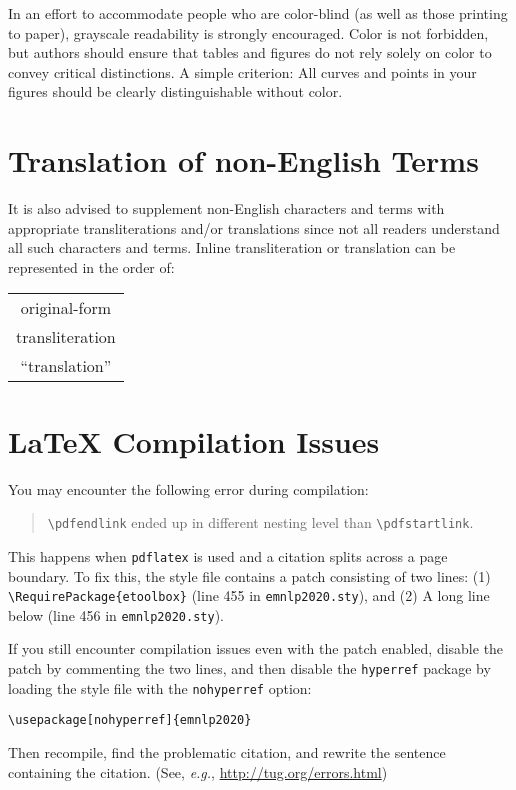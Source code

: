 \documentclass[11pt,a4paper]{article}
\begin{document}
In an effort to accommodate people who are color-blind (as well as those printing to paper), grayscale readability is strongly encouraged.
Color is not forbidden, but authors should ensure that tables and figures do not rely solely on color to convey critical distinctions.
A simple criterion:
All curves and points in your figures should be clearly distinguishable without color.

\section{Translation of non-English Terms}

It is also advised to supplement non-English characters and terms with appropriate transliterations and/or translations since not all readers understand all such characters and terms.
Inline transliteration or translation can be represented in the order of:
\begin{center}
\begin{tabular}{c}
original-form \\
transliteration \\
``translation''
\end{tabular}
\end{center}

\section{\LaTeX{} Compilation Issues}
You may encounter the following error during compilation: 
\begin{quote}
{\small\verb|\pdfendlink|} ended up in different nesting level than {\small\verb|\pdfstartlink|}.
\end{quote}
This happens when \texttt{\small pdflatex} is used and a citation splits across a page boundary.
To fix this, the style file contains a patch consisting of two lines:
(1) {\small\verb|\RequirePackage{etoolbox}|} (line 455 in \texttt{\small emnlp2020.sty}), and
(2) A long line below (line 456 in \texttt{\small emnlp2020.sty}).

If you still encounter compilation issues even with the patch enabled, disable the patch by commenting the two lines, and then disable the \texttt{\small hyperref} package by loading the style file with the \texttt{\small nohyperref} option:

\noindent
{\small\verb|\usepackage[nohyperref]{emnlp2020}|}

\noindent
Then recompile, find the problematic citation, and rewrite the sentence containing the citation. (See, {\em e.g.}, \url{http://tug.org/errors.html})
\end{document}

